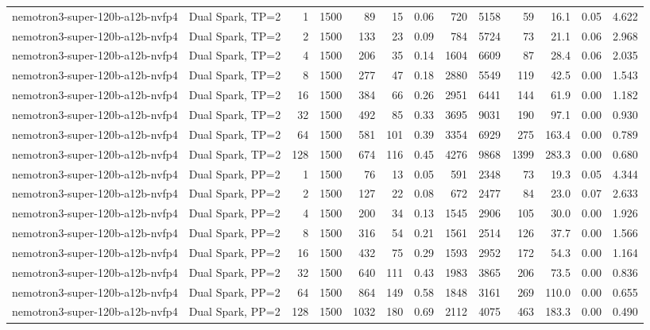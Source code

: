 \begin{tabular}{l l r r r r r r r r r r r}
\addlinespace
nemotron3-super-120b-a12b-nvfp4 & Dual Spark, TP=2 & 1 & 1500 & 89\rlap{$^\dagger$} & 15 & 0.06 & 720 & 5158 & 59 & 16.1 & 0.05 & 4.622 \\
nemotron3-super-120b-a12b-nvfp4 & Dual Spark, TP=2 & 2 & 1500 & 133 & 23 & 0.09 & 784 & 5724 & 73 & 21.1 & 0.06 & 2.968 \\
nemotron3-super-120b-a12b-nvfp4 & Dual Spark, TP=2 & 4 & 1500 & 206 & 35 & 0.14 & 1604 & 6609 & 87 & 28.4 & 0.06 & 2.035 \\
nemotron3-super-120b-a12b-nvfp4 & Dual Spark, TP=2 & 8 & 1500 & 277 & 47 & 0.18 & 2880 & 5549 & 119 & 42.5 & 0.00 & 1.543 \\
nemotron3-super-120b-a12b-nvfp4 & Dual Spark, TP=2 & 16 & 1500 & 384 & 66 & 0.26 & 2951 & 6441 & 144 & 61.9 & 0.00 & 1.182 \\
nemotron3-super-120b-a12b-nvfp4 & Dual Spark, TP=2 & 32 & 1500 & 492 & 85 & 0.33 & 3695 & 9031 & 190 & 97.1 & 0.00 & 0.930 \\
nemotron3-super-120b-a12b-nvfp4 & Dual Spark, TP=2 & 64 & 1500 & 581 & 101 & 0.39 & 3354 & 6929 & 275 & 163.4 & 0.00 & 0.789 \\
nemotron3-super-120b-a12b-nvfp4 & Dual Spark, TP=2 & 128 & 1500 & 674 & 116 & 0.45 & 4276 & 9868 & 1399 & 283.3 & 0.00 & 0.680 \\
\addlinespace
nemotron3-super-120b-a12b-nvfp4 & Dual Spark, PP=2 & 1 & 1500 & 76\rlap{$^\dagger$} & 13 & 0.05 & 591 & 2348 & 73 & 19.3 & 0.05 & 4.344 \\
nemotron3-super-120b-a12b-nvfp4 & Dual Spark, PP=2 & 2 & 1500 & 127 & 22 & 0.08 & 672 & 2477 & 84 & 23.0 & 0.07 & 2.633 \\
nemotron3-super-120b-a12b-nvfp4 & Dual Spark, PP=2 & 4 & 1500 & 200 & 34 & 0.13 & 1545 & 2906 & 105 & 30.0 & 0.00 & 1.926 \\
nemotron3-super-120b-a12b-nvfp4 & Dual Spark, PP=2 & 8 & 1500 & 316 & 54 & 0.21 & 1561 & 2514 & 126 & 37.7 & 0.00 & 1.566 \\
nemotron3-super-120b-a12b-nvfp4 & Dual Spark, PP=2 & 16 & 1500 & 432 & 75 & 0.29 & 1593 & 2952 & 172 & 54.3 & 0.00 & 1.164 \\
nemotron3-super-120b-a12b-nvfp4 & Dual Spark, PP=2 & 32 & 1500 & 640 & 111 & 0.43 & 1983 & 3865 & 206 & 73.5 & 0.00 & 0.836 \\
nemotron3-super-120b-a12b-nvfp4 & Dual Spark, PP=2 & 64 & 1500 & 864 & 149 & 0.58 & 1848 & 3161 & 269 & 110.0 & 0.00 & 0.655 \\
nemotron3-super-120b-a12b-nvfp4 & Dual Spark, PP=2 & 128 & 1500 & 1032 & 180 & 0.69 & 2112 & 4075 & 463 & 183.3 & 0.00 & 0.490 \\
\bottomrule
\end{tabular}
